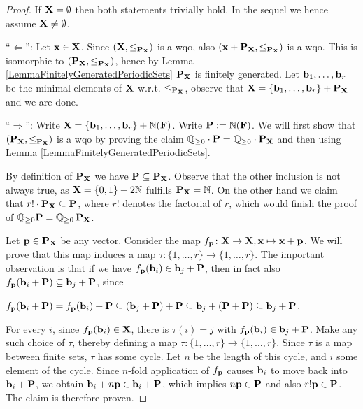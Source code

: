 \begin{proof}
If \(\mathbf{X}=\emptyset\) then both statements trivially hold. In the sequel we hence assume \(\mathbf{X} \neq \emptyset\).

``\(\Leftarrow\)'': Let \(\mathbf{x} \in \mathbf{X}\). Since \((\mathbf{X}, \leq_{\operatorname{\mathbf{P}_{\mathbf{X}}}})\) is a wqo, also \((\mathbf{x}+\operatorname{\mathbf{P}_{\mathbf{X}}}, \leq_{\operatorname{\mathbf{P}_{\mathbf{X}}}})\) is a wqo. This is isomorphic to \((\operatorname{\mathbf{P}_{\mathbf{X}}}, \leq_{\operatorname{\mathbf{P}_{\mathbf{X}}}})\), hence by Lemma \ref{LemmaFinitelyGeneratedPeriodicSets} \(\operatorname{\mathbf{P}_{\mathbf{X}}}\) is finitely generated. Let \(\mathbf{b}_1, \dots, \mathbf{b}_r\) be the minimal elements of \(\mathbf{X}\) w.r.t. \(\leq_{\operatorname{\mathbf{P}_{\mathbf{X}}}}\), observe that \(\mathbf{X}=\{\mathbf{b}_1, \dots, \mathbf{b}_r\}+\operatorname{\mathbf{P}_{\mathbf{X}}}\) and we are done.

``\(\Rightarrow\)'': Write \(\mathbf{X}=\{\mathbf{b}_1, \dots, \mathbf{b}_r\}+\mathbb{N}(\mathbf{F})\). Write \(\mathbf{P}:=\mathbb{N}(\mathbf{F})\). We will first show that \((\operatorname{\mathbf{P}_{\mathbf{X}}}, \leq_{\operatorname{\mathbf{P}_{\mathbf{X}}}})\) is a wqo by proving the claim \(\mathbb{Q}_{\geq 0} \cdot \mathbf{P}=\mathbb{Q}_{\geq 0} \cdot \operatorname{\mathbf{P}_{\mathbf{X}}}\) and then using Lemma \ref{LemmaFinitelyGeneratedPeriodicSets}.

By definition of \(\operatorname{\mathbf{P}_{\mathbf{X}}}\) we have \(\mathbf{P} \subseteq \operatorname{\mathbf{P}_{\mathbf{X}}}\). Observe that the other inclusion is not always true, as \( \mathbf{X}=\{0,1\}+2\mathbb{N}\) fulfills \(\operatorname{\mathbf{P}_{\mathbf{X}}}=\mathbb{N}\). On the other hand we claim that \(r! \cdot \operatorname{\mathbf{P}_{\mathbf{X}}} \subseteq \mathbf{P}\), where \(r!\) denotes the factorial of \(r\), which would finish the proof of \(\mathbb{Q}_{\geq 0} \mathbf{P}=\mathbb{Q}_{\geq 0} \operatorname{\mathbf{P}_{\mathbf{X}}}\). 

Let \(\mathbf{p} \in \operatorname{\mathbf{P}_{\mathbf{X}}}\) be any vector. Consider the map \(f_{\mathbf{p}} \colon \mathbf{X} \to \mathbf{X}, \mathbf{x} \mapsto \mathbf{x}+\mathbf{p}\). We will prove that this map induces a map \(\tau \colon \{1,\dots, r\} \to \{1,\dots, r\}\). The important observation is that if we have \(f_{\mathbf{p}}(\mathbf{b}_i) \in \mathbf{b}_j +\mathbf{P}\), then in fact also \(f_{\mathbf{p}}(\mathbf{b}_i+\mathbf{P}) \subseteq \mathbf{b}_j + \mathbf{P}\), since 

\(f_{\mathbf{p}}(\mathbf{b}_i+\mathbf{P})=f_{\mathbf{p}}(\mathbf{b}_i)+\mathbf{P} \subseteq (\mathbf{b}_j + \mathbf{P})+\mathbf{P} \subseteq \mathbf{b}_j + (\mathbf{P}+\mathbf{P}) \subseteq \mathbf{b}_j+\mathbf{P}\).

For every \(i\), since \(f_{\mathbf{p}}(\mathbf{b}_i) \in \mathbf{X}\), there is \(\tau(i)=j\) with \(f_{\mathbf{p}}(\mathbf{b}_i) \in \mathbf{b}_j + \mathbf{P}\). Make any such choice of \(\tau\), thereby defining a map \(\tau \colon \{1,\dots, r\} \to \{1,\dots, r\}\). Since \(\tau\) is a map between finite sets, \(\tau\) has some cycle. Let \(n\) be the length of this cycle, and \(i\) some element of the cycle. Since \(n\)-fold application of \(f_{\mathbf{p}}\) causes \(\mathbf{b}_i\) to move back into \(\mathbf{b}_i+\mathbf{P}\), we obtain \(\mathbf{b}_i+n \mathbf{p} \in \mathbf{b}_i+\mathbf{P}\), which implies \(n \mathbf{p} \in \mathbf{P}\) and also \(r! \mathbf{p} \in \mathbf{P}\). The claim is therefore proven.


\end{proof}
